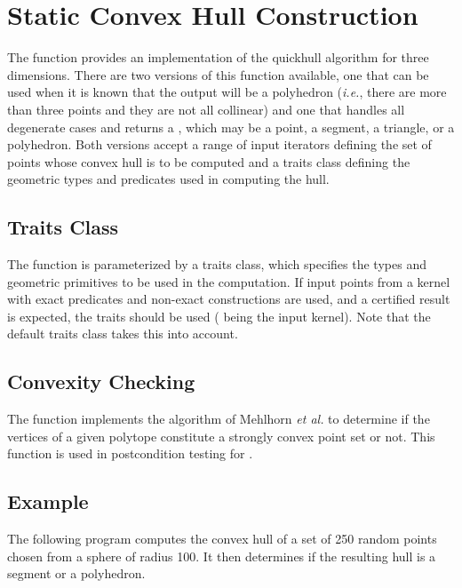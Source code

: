 \section{Static Convex Hull Construction\label{sec:convex_hull_3}}


The function 
 provides an 
implementation of the quickhull algorithm \cite{bdh-qach-96} for three 
dimensions.  There are two versions of this
function available, one that can be used when it is known that the output
will be a polyhedron (\textit{i.e.}, there are more than three points and
they are not all collinear) and one that handles all degenerate cases
and returns a , which may be a point, a segment, a
triangle, or a polyhedron.  Both versions accept a range of input
iterators defining the set of points whose convex hull is to be computed
and a traits class defining the geometric types and predicates used in
computing the hull.

\subsection{Traits Class}

The function  is parameterized by a traits class,
which specifies the types and geometric primitives to be used in the
computation. If input points from a kernel with exact predicates 
and non-exact constructions are used, and a certified result is expected,
the traits  should be used 
( being the input kernel). Note that the default traits class takes this into
account.

\subsection{Convexity Checking}

The function 
implements the algorithm of Mehlhorn \textit{et al.} \cite{mnssssu-cgpvg-96} 
to determine if the vertices of a given polytope constitute a strongly convex 
point set or not.  This function is used in postcondition testing for
.

\subsection{Example}
The following program computes the convex hull of a set of 250 random
points chosen from a sphere of radius 100.  It then determines if the 
resulting hull is a segment or a polyhedron.  

